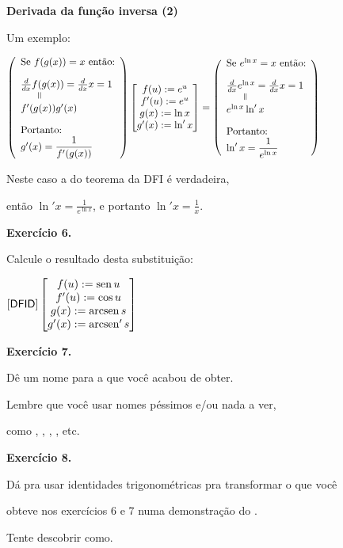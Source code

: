 \documentclass[oneside,12pt]{article}
\begin{document}
\newpage


{\bf Derivada da função inversa (2)}

Um exemplo:

\msk

$\scalebox{0.9}{$
  \DFID
  \bmat{ f(u):=e^u \\ f'(u):=e^u \\ g(x):=\ln x \\ g'(x):=\ln' x } =
  \left(
  \begin{array}{l}
  \text{Se $e^{\ln x}=x$ então:} \\[10pt]
  \frac{d}{dx} e^{\ln x} = \frac{d}{dx} x = 1 \\
  \phantom{mm}\veq \\
  e^{\ln x} \ln' x \\[10pt]
  \text{Portanto:} \\
  \ln' x = \D \frac{1}{e^{\ln x}} \\
  \end{array}
  \right)
  $}
$

\bsk

Neste caso a  do teorema da DFI é verdadeira,

então $\ln' x = \frac{1}{e^{\ln x}}$, e portanto $\ln' x = \frac 1x$.

\newpage


{\bf Exercício 6.}

Calcule o resultado desta substituição:

$\mathsf{[DFID]} \left [\begin{matrix}f(u) := \operatorname{sen} u \\ f'(u) := \cos u \\ g(x) := \operatorname{arcsen} s \\ g'(x) := \operatorname{arcsen}' s\end{matrix}\right ]$

\bsk

{\bf Exercício 7.}

Dê um nome para a  que você acabou de obter.

Lembre que você  usar nomes péssimos e/ou nada a ver,

como , , , , etc.

\bsk

{\bf Exercício 8.}

Dá pra usar identidades trigonométricas pra transformar o que você

obteve nos exercícios 6 e 7 numa demonstração do .

Tente descobrir como.



\end{document}
